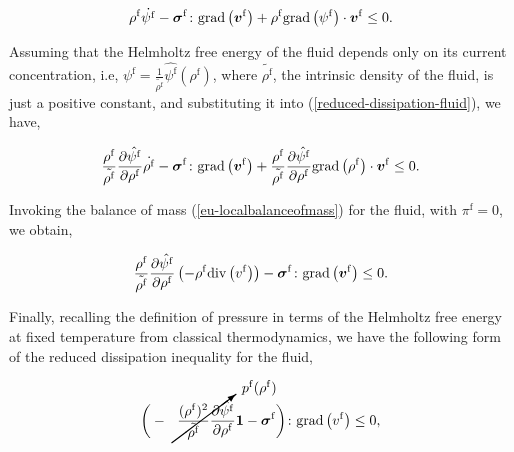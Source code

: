 \begin{equation}
\rho^{\mathrm{f}} \dot{\psi^{\mathrm{f}}} -\mbox{\boldmath$\sigma$}^{\mathrm{f}} \colon
\mathrm{grad}\left(\mbox{\boldmath$ v$}^{\mathrm{f}}\right)+ \rho^{\mathrm{f}}
\mathrm{grad} \left(\psi^{\mathrm{f}}\right) \cdot\mbox{\boldmath$ v$}^{\mathrm{f}}
\leq 0.
\label{reduced-dissipation-fluid}
\end{equation}

Assuming that the Helmholtz free energy of the fluid depends only on
its current concentration, i.e, $\psi^{\mathrm{f}} =
\frac{1}{\tilde{\rho^{\mathrm{f}}}} \hat{\psi^{\mathrm{f}}}
(\rho^{\mathrm{f}})$, where $\tilde{\rho^{\mathrm{f}}}$, the intrinsic
density of the fluid, is just a positive constant, and substituting it
into (\ref{reduced-dissipation-fluid}), we have,

\begin{equation*}
\frac{\rho^{\mathrm{f}}}{\tilde{\rho^{\mathrm{f}}}}
\frac{\partial \hat{\psi^{\mathrm{f}}}}{\partial \rho^{\mathrm{f}}}
\dot{\rho^{\mathrm{f}}}
-\mbox{\boldmath$\sigma$}^{\mathrm{f}}\colon\mathrm{grad}
\left(\mbox{\boldmath$ v$}^{\mathrm{f}}\right) +
\frac{\rho^{\mathrm{f}}}{\tilde{\rho^{\mathrm{f}}}}
\frac{\partial \hat{\psi^{\mathrm{f}}}}{\partial \rho^{\mathrm{f}}}
\mathrm{grad}\left(\rho^{\mathrm{f}}\right) 
\cdot\mbox{\boldmath$ v$}^{\mathrm{f}}
\leq 0.
\end{equation*}

\noindent Invoking the balance of mass (\ref{eu-localbalanceofmass})
for the fluid, with $\pi^\mathrm{f} = 0$, we obtain,

\begin{equation*}
\frac{\rho^{\mathrm{f}}}{\tilde{\rho^{\mathrm{f}}}}
\frac{\partial \hat{\psi^{\mathrm{f}}}}{\partial \rho^{\mathrm{f}}}
\left(- \rho^{\mathrm{f}} \mathrm{div}\left( v^{\mathrm{f}}
\right)\right) 
-\mbox{\boldmath$\sigma$}^{\mathrm{f}}\colon\mathrm{grad}
\left(\mbox{\boldmath$ v$}^{\mathrm{f}}\right)
\leq 0.
\end{equation*}

\noindent Finally, recalling the definition of pressure in terms of
the Helmholtz free energy at fixed temperature from classical
thermodynamics, we have the following form of the reduced dissipation
inequality for the fluid,

\begin{equation*}
\bigg( - \cancelto{p^{\mathrm{f}}(\rho^{\mathrm{f}})}
{\frac{(\rho^{\mathrm{f}})^2}{\tilde{\rho^{\mathrm{f}}}}
\frac{\partial \hat{\psi^{\mathrm{f}}}}{\partial \rho^{\mathrm{f}}}}
\bone -\Bsigma^{\mathrm{f}} \bigg) \colon \mathrm{grad}\left( v^{\mathrm{f}}
\right)
\leq 0,
\end{equation*}

